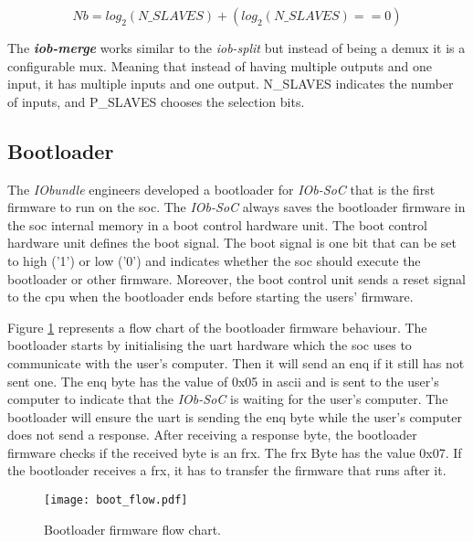 \begin{equation}
    \label{eq:number_bits}
    Nb = log_2(N\_SLAVES)+(log_2(N\_SLAVES)==0)
\end{equation}

The \textbf{\textit{iob-merge}} works similar to the \textit{iob-split} but instead of being a \acrshort{demux} it is a configurable \acrfull{mux}. Meaning that instead of having multiple outputs and one input, it has multiple inputs and one output. N\_SLAVES indicates the number of inputs, and P\_SLAVES chooses the selection bits.

\subsection{Bootloader}
The \textit{IObundle} engineers developed a bootloader for \textit{IOb-SoC} that is the first firmware to run on the \acrlong{soc}. The \textit{IOb-SoC} always saves the bootloader firmware in the \acrshort{soc} internal memory in a boot control hardware unit. The boot control hardware unit defines the boot signal. The boot signal is one bit that can be set to high ('1') or low ('0') and indicates whether the \acrshort{soc} should execute the bootloader or other firmware. Moreover, the boot control unit sends a reset signal to the \acrshort{cpu} when the bootloader ends before starting the users' firmware.

Figure \ref{fig:boot_flow} represents a flow chart of the bootloader firmware behaviour. The bootloader starts by initialising the \acrshort{uart} hardware which the \acrshort{soc} uses to communicate with the user's computer. Then it will send an \acrfull{enq} if it still has not sent one. The \acrshort{enq} byte has the value of 0x05 in \acrshort{ascii} and is sent to the user's computer to indicate that the \textit{IOb-SoC} is waiting for the user's computer. The bootloader will ensure the \acrshort{uart} is sending the \acrshort{enq} byte while the user's computer does not send a response. After receiving a response byte, the bootloader firmware checks if the received byte is an \acrfull{frx}. The \acrshort{frx} Byte has the value 0x07. If the bootloader receives a \acrshort{frx}, it has to transfer the firmware that runs after it.

\begin{figure}[!ht]
    \centering
    \texttt{[image: boot\_flow.pdf]}
    \caption{Bootloader firmware flow chart.}
    \label{fig:boot_flow}
\end{figure}

